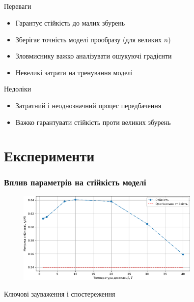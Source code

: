 \documentclass{beamer}
\numberwithin{equation}{section}
\begin{document}
	\subsection{}
	\begin{frame}
		\begin{block}{Переваги}
			\begin{itemize}
				\item Гарантує стійкість до малих збурень
				\item Зберігає точність моделі прообразу (для великих $n$)
				\item Зловмиснику важко аналізувати ошукуючі градієнти
				\item Невеликі затрати на тренування моделі
			\end{itemize}
		\end{block}
		
		\begin{block}{Недоліки}
			\begin{itemize}
				\item Затратний і неоднозначний процес передбачення
				\item Важко гарантувати стійкість проти великих збурень
			\end{itemize}
		\end{block}
	\end{frame}

	
	
	
	\section{Експерименти}
	\begin{frame}
		\frametitle{Вплив параметрів на стійкість моделі}
		
		\begin{figure}[h]
			\centering
			\includegraphics[width=0.8\textwidth]{../images/robustness.pdf}
			
		\end{figure}
	
		Ключові зауваження і спостереження
	\end{frame}
\end{document}
